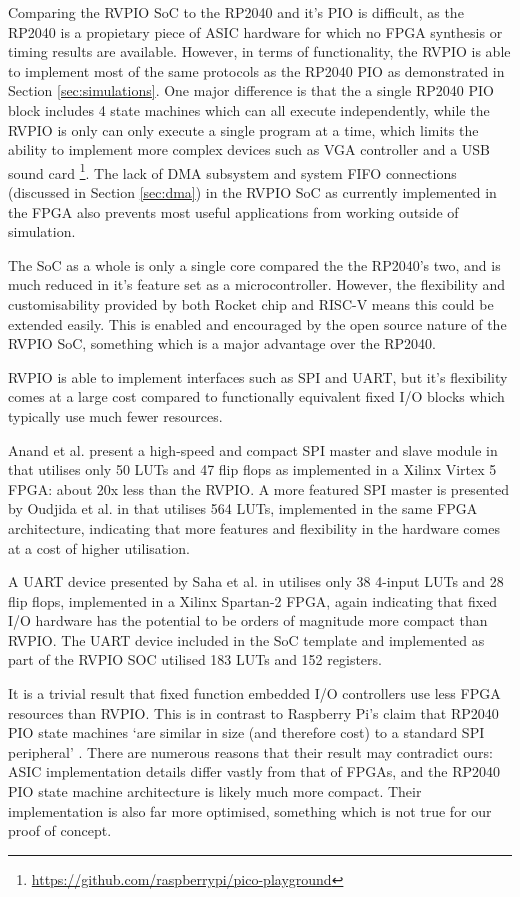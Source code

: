 Comparing the RVPIO SoC to the RP2040 and it's PIO is difficult, as the RP2040 is a propietary piece of ASIC hardware for which no FPGA synthesis or timing results are available. However, in terms of functionality, the RVPIO is able to implement most of the same protocols as the RP2040 PIO as demonstrated in Section \ref{sec:simulations}. One major difference is that the a single RP2040 PIO block includes 4 state machines which can all execute independently, while the RVPIO is only can only execute a single program at a time, which limits the ability to implement more complex devices such as VGA controller and a USB sound card \footnote{\url{https://github.com/raspberrypi/pico-playground}}. The lack of DMA subsystem and system FIFO connections (discussed in Section \ref{sec:dma}) in the RVPIO SoC as currently implemented in the FPGA also prevents most useful applications from working outside of simulation.

The SoC as a whole is only a single core compared the the RP2040's two, and is much reduced in it's feature set as a microcontroller. However, the flexibility and customisability provided by both Rocket chip and RISC-V means this could be extended easily. This is enabled and encouraged by the open source nature of the RVPIO SoC, something which is a major advantage over the RP2040.

RVPIO is able to implement interfaces such as SPI and UART, but it's flexibility comes at a large cost compared to functionally equivalent fixed I/O blocks which typically use much fewer resources.

Anand et al. present a high-speed and compact SPI master and slave module in \cite{spi-device} that utilises only 50 LUTs and 47 flip flops as implemented in a Xilinx Virtex 5 FPGA: about 20x less than the RVPIO. A more featured SPI master is presented by Oudjida et al. in \cite{spi-i2c} that utilises 564 LUTs, implemented in the same FPGA architecture, indicating that more features and flexibility in the hardware comes at a cost of higher utilisation.

A UART device presented by Saha et al. in \cite{uart-device} utilises only 38 4-input LUTs and 28 flip flops, implemented in a Xilinx Spartan-2 FPGA, again indicating that fixed I/O hardware has the potential to be orders of magnitude more compact than RVPIO. The UART device included in the SoC template and implemented as part of the RVPIO SOC utilised 183 LUTs and 152 registers.

It is a trivial result that fixed function embedded I/O controllers use less FPGA resources than RVPIO. This is in contrast to Raspberry Pi's claim that RP2040 PIO state machines `are similar in size (and therefore cost) to a standard SPI peripheral' \cite{picosdk}. There are numerous reasons that their result may contradict ours: ASIC implementation details differ vastly from that of FPGAs, and the RP2040 PIO state machine architecture is likely much more compact. Their implementation is also far more optimised, something which is not true for our proof of concept.

